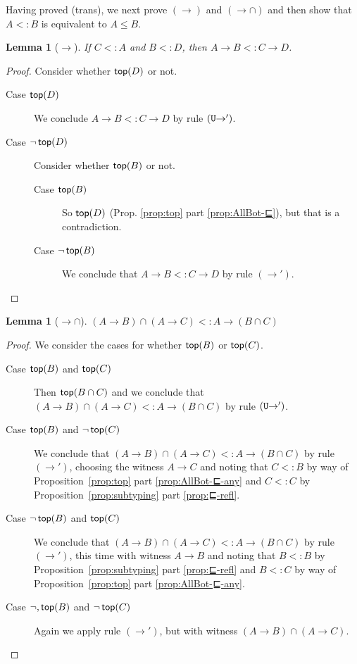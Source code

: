 \documentclass{article}
\newtheorem{lemma}[theorem]{Lemma}
\begin{document}
Having proved (trans), we next prove $(\to)$ and $({\to}{\cap})$
and then show that $A <: B$ is equivalent to $A \leq B$.

\begin{lemma}[$\to$]\label{lem:⊑-fun′}
  If $C <: A$ and $B <: D$, then
  $A \to B <: C \to D$.
\end{lemma}
\begin{proof}
  Consider whether $\mathsf{top}(D)$ or not.
  \begin{description}
  \item[Case $\mathsf{top}(D)$] We conclude $A \to B <: C \to D$
    by rule $(\mathtt{U}{\to}')$.
  \item[Case $\neg \,\mathsf{top}(D)$]
    Consider whether $\mathsf{top}(B)$ or not.
    \begin{description}
    \item[Case $\mathsf{top}(B)$] So $\mathsf{top}(D)$ (Prop. \ref{prop:top}
      part \ref{prop:AllBot-⊑}), but that is a contradiction.
    \item[Case $\neg\,\mathsf{top}(B)$]
      We conclude that $A \to B <: C \to D$ by rule $(\to')$.
    \end{description}
  \end{description}
\end{proof}

\begin{lemma}[${\to}{\cap}$]\label{lem:⊑-dist}
  $(A \to B) \cap (A \to C) <: A \to (B \cap C)$
\end{lemma}
\begin{proof}
   We consider the cases for whether $\mathsf{top}(B)$ or $\mathsf{top}(C)$.
   \begin{description}
   \item[Case $\mathsf{top}(B)$ and $\mathsf{top}(C)$]
     Then $\mathsf{top}(B \cap C)$ and we conclude that
     $(A \to B) \cap (A \to C) <: A \to (B \cap C)$
     by rule $(\mathtt{U}{\to}')$.
   \item[Case $\mathsf{top}(B)$ and $\neg\,\mathsf{top}(C)$]
     We conclude that 
     $(A \to B) \cap (A \to C) <: A \to (B \cap C)$
     by rule $(\to')$, choosing the witness $A \to C$
     and noting that $C <: B$ 
     by way of Proposition~\ref{prop:top}
     part \ref{prop:AllBot-⊑-any}
     and $C <: C$ by Proposition~\ref{prop:subtyping}
     part \ref{prop:⊑-refl}.
   \item[Case $\neg\,\mathsf{top}(B)$ and $\mathsf{top}(C)$]
     We conclude that 
     $(A \to B) \cap (A \to C) <: A \to (B \cap C)$
     by rule $(\to')$, this time with witness $A \to B$
     and noting that
     $B <: B$ by Proposition~\ref{prop:subtyping}
     part \ref{prop:⊑-refl}
     and $B <: C$ 
     by way of Proposition~\ref{prop:top}
     part \ref{prop:AllBot-⊑-any}.
   \item[Case $\neg,\mathsf{top}(B)$ and $\neg\,\mathsf{top}(C)$]
     Again we apply rule $(\to')$, but with witness
     $(A \to B) \cap (A \to C)$.
   \end{description}
\end{proof}
\end{document}
